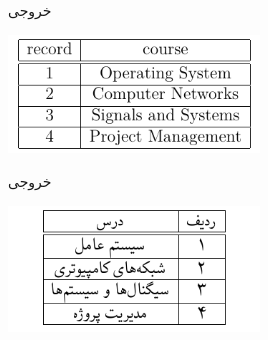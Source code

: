 \begin{frame}{خروجی}
\begin{center}
\includegraphics[width=0.5\textwidth]{docs/images/engcounter}
\end{center}
\end{frame}

\begin{frame}{خروجی}
\begin{center}
\includegraphics[width=0.5\textwidth]{docs/images/facounter}
\end{center}
\end{frame}
